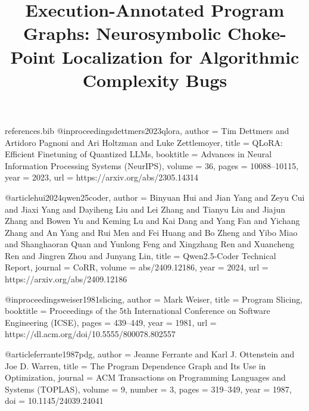 \begin{filecontents*}{references.bib}
@inproceedings{dettmers2023qlora,
  author    = {Tim Dettmers and Artidoro Pagnoni and Ari Holtzman and Luke Zettlemoyer},
  title     = {{QLoRA: Efficient Finetuning of Quantized LLMs}},
  booktitle = {Advances in Neural Information Processing Systems (NeurIPS)},
  volume    = {36},
  pages     = {10088--10115},
  year      = {2023},
  url       = {https://arxiv.org/abs/2305.14314}
}

@article{hui2024qwen25coder,
  author    = {Binyuan Hui and Jian Yang and Zeyu Cui and Jiaxi Yang and Dayiheng Liu and Lei Zhang and Tianyu Liu and Jiajun Zhang and Bowen Yu and Keming Lu and Kai Dang and Yang Fan and Yichang Zhang and An Yang and Rui Men and Fei Huang and Bo Zheng and Yibo Miao and Shanghaoran Quan and Yunlong Feng and Xingzhang Ren and Xuancheng Ren and Jingren Zhou and Junyang Lin},
  title     = {{Qwen2.5-Coder Technical Report}},
  journal   = {CoRR},
  volume    = {abs/2409.12186},
  year      = {2024},
  url       = {https://arxiv.org/abs/2409.12186}
}

@inproceedings{weiser1981slicing,
  author    = {Mark Weiser},
  title     = {{Program Slicing}},
  booktitle = {Proceedings of the 5th International Conference on Software Engineering (ICSE)},
  pages     = {439--449},
  year      = {1981},
  url       = {https://dl.acm.org/doi/10.5555/800078.802557}
}

@article{ferrante1987pdg,
  author    = {Jeanne Ferrante and Karl J. Ottenstein and Joe D. Warren},
  title     = {{The Program Dependence Graph and Its Use in Optimization}},
  journal   = {ACM Transactions on Programming Languages and Systems (TOPLAS)},
  volume    = {9},
  number    = {3},
  pages     = {319--349},
  year      = {1987},
  doi       = {10.1145/24039.24041}
}
\end{filecontents*}

\documentclass[10pt,conference]{IEEEtran}
\usepackage{amsmath,amssymb,amsfonts}
\usepackage{booktabs}
\usepackage{hyperref}
\usepackage{microtype}

\title{Execution-Annotated Program Graphs: Neurosymbolic Choke-Point Localization for Algorithmic Complexity Bugs}

\author{}


\maketitle

